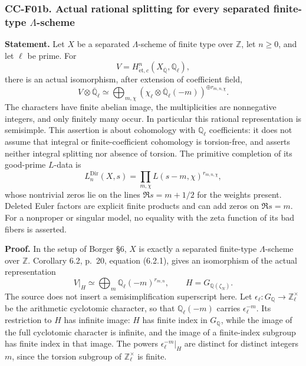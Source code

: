 \subsubsection{\texorpdfstring{CC-F01b. Actual rational splitting for
every separated finite-type
\(\Lambda\)-scheme}{CC-F01b. Actual rational splitting for every separated finite-type \textbackslash Lambda-scheme}}\label{cc-f01b.-actual-rational-splitting-for-every-separated-finite-type-lambda-scheme}

\textbf{Statement.} Let \(X\) be a separated \(\Lambda\)-scheme of
finite type over \(\mathbb Z\), let \(n\ge0\), and let \(\ell\) be
prime. For \[
 V=H^n_{\mathrm{\acute et},c}(X_{\overline{\mathbb Q}},\mathbb Q_\ell),
\] there is an actual isomorphism, after extension of coefficient field,
\[
 V\otimes\overline{\mathbb Q}_\ell
 \simeq\bigoplus_{m,\chi}
 (\chi_\ell\otimes\overline{\mathbb Q}_\ell(-m))^{\oplus r_{m,n,\chi}}.
 \tag{CC-F01b.1}
\] The characters have finite abelian image, the multiplicities are
nonnegative integers, and only finitely many occur. In particular this
rational representation is semisimple. This assertion is about
cohomology with \(\mathbb Q_\ell\) coefficients: it does not assume that
integral or finite-coefficient cohomology is torsion-free, and asserts
neither integral splitting nor absence of torsion. The primitive
completion of its good-prime \(L\)-data is \[
 L_n^{\mathrm{Dir}}(X,s)=\prod_{m,\chi}L(s-m,\chi)^{r_{m,n,\chi}},
 \tag{CC-F01b.2}
\] whose nontrivial zeros lie on the lines \(\Re s=m+1/2\) for the
weights present. Deleted Euler factors are explicit finite products and
can add zeros on \(\Re s=m\). For a nonproper or singular model, no
equality with the zeta function of its bad fibers is asserted.

\textbf{Proof.} In the setup of Borger §6, \(X\) is exactly a separated
finite-type \(\Lambda\)-scheme over \(\mathbb Z\). Corollary 6.2, p.~20,
equation (6.2.1), gives an isomorphism of the actual representation \[
 V|_H\simeq\bigoplus_m\mathbb Q_\ell(-m)^{r_{m,n}},
 \qquad H=G_{\mathbb Q(\zeta_N)}.
\] The source does not insert a semisimplification superscript here. Let
\(\epsilon_\ell:G_\mathbb Q\to\mathbb Z_\ell^\times\) be the arithmetic
cyclotomic character, so that \(\mathbb Q_\ell(-m)\) carries
\(\epsilon_\ell^{-m}\). Its restriction to \(H\) has infinite image:
\(H\) has finite index in \(G_\mathbb Q\), while the image of the full
cyclotomic character is infinite, and the image of a finite-index
subgroup has finite index in that image. The powers
\(\epsilon_\ell^{-m}|_H\) are distinct for distinct integers \(m\),
since the torsion subgroup of \(\mathbb Z_\ell^\times\) is finite.

